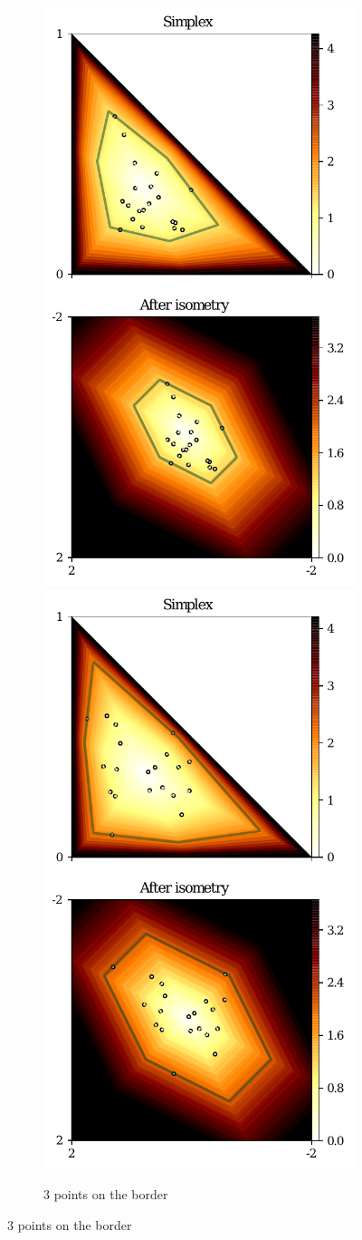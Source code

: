 \documentclass[graybox]{svmult}
\begin{document}
\begin{figure}[t]
\centering
\begin{subfigure}[m]{.48\textwidth}
\includegraphics[width=.5\textwidth]{harpe2017.pdf}%
\includegraphics[width=.5\textwidth]{harpe2026.pdf}
\caption{$3$ points on the border}
\end{subfigure}

\end{figure}
\end{document}
